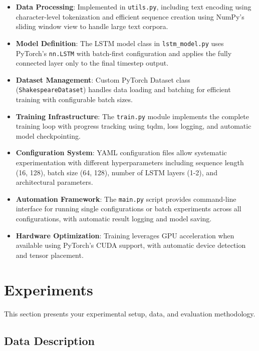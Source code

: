 \documentclass[12pt]{article}
\begin{document}
\begin{itemize}
    \item \textbf{Data Processing}: Implemented in \texttt{utils.py}, including text encoding using character-level tokenization and efficient sequence creation using NumPy's sliding window view to handle large text corpora.
    
    \item \textbf{Model Definition}: The LSTM model class in \texttt{lstm\_model.py} uses PyTorch's \texttt{nn.LSTM} with batch-first configuration and applies the fully connected layer only to the final timestep output.
    
    \item \textbf{Dataset Management}: Custom PyTorch Dataset class (\texttt{ShakespeareDataset}) handles data loading and batching for efficient training with configurable batch sizes.
    
    \item \textbf{Training Infrastructure}: The \texttt{train.py} module implements the complete training loop with progress tracking using tqdm, loss logging, and automatic model checkpointing.
    
    \item \textbf{Configuration System}: YAML configuration files allow systematic experimentation with different hyperparameters including sequence length (16, 128), batch size (64, 128), number of LSTM layers (1-2), and architectural parameters.
    
    \item \textbf{Automation Framework}: The \texttt{main.py} script provides command-line interface for running single configurations or batch experiments across all configurations, with automatic result logging and model saving.
    
    \item \textbf{Hardware Optimization}: Training leverages GPU acceleration when available using PyTorch's CUDA support, with automatic device detection and tensor placement.
\end{itemize}

\section{Experiments}
\label{sec:experiments}

This section presents your experimental setup, data, and evaluation methodology.

\subsection{Data Description}
\label{subsec:data}
\end{document}
